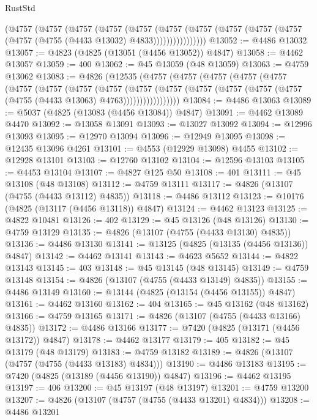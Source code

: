 \begin{lexlean}{RustStd}
\begin{coremodule}
            (@4757
              (@4757
                (@4757
                  (@4757
                    (@4757
                      (@4757
                        (@4757
                          (@4757 (@4757 (@4757 (@4757 (@4755 (@4433 @13032) @4833))))))))))))))))
@13052 := @4486 @13032
@13057 := @4823 (@4825 (@13051 (@4456 @13052)) @4847)
@13058 := @4462 @13057
@13059 := 400
@13062 := @45 @13059 (@48 @13059)
@13063 := @4759 @13062
@13083 := @4826
    (@12535
      (@4757
        (@4757
          (@4757
            (@4757
              (@4757
                (@4757
                  (@4757
                    (@4757
                      (@4757
                        (@4757
                          (@4757
                            (@4757 (@4757 (@4757 (@4757 (@4755 (@4433 @13063) @4763)))))))))))))))))
@13084 := @4486 @13063
@13089 := @5037 (@4825 (@13083 (@4456 @13084)) @4847)
@13091 := @4462 @13089 @4470
@13092 := @13058 @13091
@13093 := @13027 @13092
@13094 := @12996 @13093
@13095 := @12970 @13094
@13096 := @12949 @13095
@13098 := @12435 @13096 @4261
@13101 := @4553 (@12929 @13098) @4455
@13102 := @12928 @13101
@13103 := @12760 @13102
@13104 := @12596 @13103
@13105 := @4453 @13104
@13107 := @4827 @125 @50
@13108 := 401
@13111 := @45 @13108 (@48 @13108)
@13112 := @4759 @13111
@13117 := @4826 (@13107 (@4755 (@4433 @13112) @4835))
@13118 := @4486 @13112
@13123 := @10176 (@4825 (@13117 (@4456 @13118)) @4847)
@13124 := @4462 @13123
@13125 := @4822 @10481
@13126 := 402
@13129 := @45 @13126 (@48 @13126)
@13130 := @4759 @13129
@13135 := @4826 (@13107 (@4755 (@4433 @13130) @4835))
@13136 := @4486 @13130
@13141 := @13125 (@4825 (@13135 (@4456 @13136)) @4847)
@13142 := @4462 @13141
@13143 := @4623 @5652
@13144 := @4822 @13143
@13145 := 403
@13148 := @45 @13145 (@48 @13145)
@13149 := @4759 @13148
@13154 := @4826 (@13107 (@4755 (@4433 @13149) @4835))
@13155 := @4486 @13149
@13160 := @13144 (@4825 (@13154 (@4456 @13155)) @4847)
@13161 := @4462 @13160
@13162 := 404
@13165 := @45 @13162 (@48 @13162)
@13166 := @4759 @13165
@13171 := @4826 (@13107 (@4755 (@4433 @13166) @4835))
@13172 := @4486 @13166
@13177 := @7420 (@4825 (@13171 (@4456 @13172)) @4847)
@13178 := @4462 @13177
@13179 := 405
@13182 := @45 @13179 (@48 @13179)
@13183 := @4759 @13182
@13189 := @4826 (@13107 (@4757 (@4755 (@4433 @13183) @4834)))
@13190 := @4486 @13183
@13195 := @7420 (@4825 (@13189 (@4456 @13190)) @4847)
@13196 := @4462 @13195
@13197 := 406
@13200 := @45 @13197 (@48 @13197)
@13201 := @4759 @13200
@13207 := @4826 (@13107 (@4757 (@4755 (@4433 @13201) @4834)))
@13208 := @4486 @13201

\end{coremodule}
\end{lexlean}
